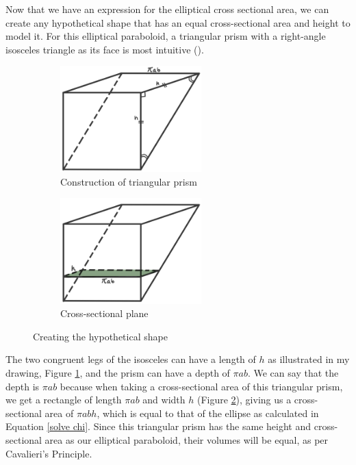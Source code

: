 \documentclass[12pt]{article}
\begin{document}
Now that we have an expression for the elliptical cross sectional area, we can create any hypothetical shape that has an equal cross-sectional area and height to model it. For this elliptical paraboloid, a triangular prism with a right-angle isosceles triangle as its face is most intuitive (\citeauthor{bogomolny}). 

\begin{figure}[h]
     \centering
     \begin{subfigure}[b]{0.45\textwidth}
         \centering
         \includegraphics[width=0.6\textwidth]{more images/tria.jpg}
         \caption{Construction of triangular prism}
         \label{fig:full trig}
     \end{subfigure}
     \hfill
     \begin{subfigure}[b]{0.45\textwidth}
         \centering
         \includegraphics[width=0.6\textwidth]{more images/tria cross.jpg}
         \caption{Cross-sectional plane}
         \label{fig:cross trig}
     \end{subfigure}
     \hfill
        \caption{Creating the hypothetical shape}
        \label{fig:axes}
\end{figure}

The two congruent legs of the isosceles can have a length of $h$ as illustrated in my drawing, Figure \ref{fig:full trig}, and the prism can have a depth of $\pi a b$. We can say that the depth is $\pi ab$ because when taking a cross-sectional area of this triangular prism, we get a rectangle of length $\pi ab$ and width $h$ (Figure \ref{fig:cross trig}), giving us a cross-sectional area of $\pi ab h$, which is equal to that of the ellipse as calculated in Equation \ref{solve chi}. Since this triangular prism has the same height and cross-sectional area as our elliptical paraboloid, their volumes will be equal, as per Cavalieri's Principle.
\end{document}
